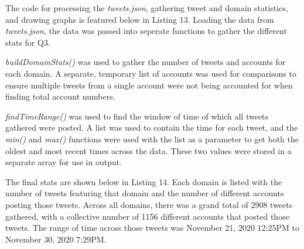 \documentclass[12pt]{article}
\begin{document}
The code for processing the \emph{tweets.json}, gathering tweet and domain statistics, and drawing graphs is featured below in Listing 13. Loading the data from \emph{tweets.json}, the data was passed into seperate functions to gather the different stats for Q3. 




\par \emph{buildDomainStats()} was used to gather the number of tweets and accounts for each domain. A separate, temporary list of accounts was used for comparisons to ensure multiple tweets from a single account were not being accounted for when finding total account numbers.

\par \emph{findTimeRange()} was used to find the window of time of which all tweets gathered were posted. A list was used to contain the time for each tweet, and the \emph{min()} and \emph{max()} functions were used with the list as a parameter to get both the oldest and most recent times across the data. These two values were stored in a separate array for use in output.

\par The final stats are shown below in Listing 14. Each domain is listed with the number of tweets featuring that domain and the number of different accounts posting those tweets. Across all domains, there was a grand total of 2908 tweets gathered, with a collective number of 1156 different accounts that posted those tweets. The range of time across those tweets was November 21, 2020 12:25PM to November 30, 2020 7:29PM.
\end{document}
